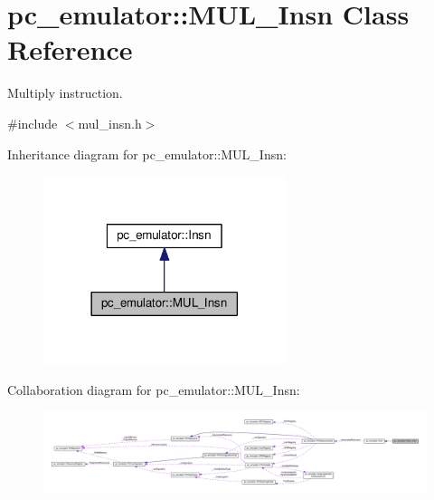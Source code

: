 \hypertarget{classpc__emulator_1_1MUL__Insn}{}\section{pc\+\_\+emulator\+:\+:M\+U\+L\+\_\+\+Insn Class Reference}
\label{classpc__emulator_1_1MUL__Insn}


Multiply instruction.  




{\ttfamily \#include $<$mul\+\_\+insn.\+h$>$}



Inheritance diagram for pc\+\_\+emulator\+:\+:M\+U\+L\+\_\+\+Insn\+:
\nopagebreak
\begin{figure}[H]
\begin{center}
\leavevmode
\includegraphics[width=201pt]{classpc__emulator_1_1MUL__Insn__inherit__graph}
\end{center}
\end{figure}


Collaboration diagram for pc\+\_\+emulator\+:\+:M\+U\+L\+\_\+\+Insn\+:
\nopagebreak
\begin{figure}[H]
\begin{center}
\leavevmode
\includegraphics[width=350pt]{classpc__emulator_1_1MUL__Insn__coll__graph}
\end{center}
\end{figure}
